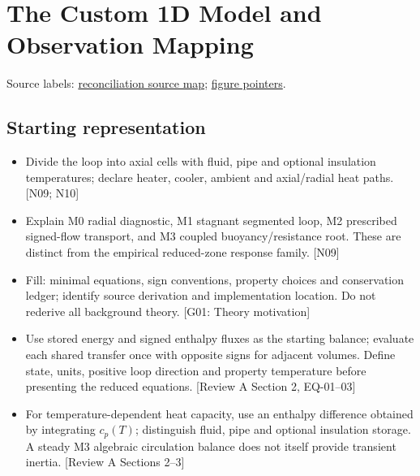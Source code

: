 \section{The Custom 1D Model and Observation Mapping}
\noindent\small Source labels: \href{run:doc_support/reconciliation/2026-11-02/SOURCES.md}{reconciliation source map}; \href{run:doc_support/reconciliation/2026-11-02/FIGURE_POINTERS.md}{figure pointers}.\normalsize

\subsection{Starting representation}
\begin{itemize}[leftmargin=*]
\item Divide the loop into axial cells with fluid, pipe and optional insulation temperatures; declare heater, cooler, ambient and axial/radial heat paths. [N09; N10]
\item Explain M0 radial diagnostic, M1 stagnant segmented loop, M2 prescribed signed-flow transport, and M3 coupled buoyancy/resistance root. These are distinct from the empirical reduced-zone response family. [N09]
\item Fill: minimal equations, sign conventions, property choices and conservation ledger; identify source derivation and implementation location. Do not rederive all background theory. [G01: Theory motivation]
\item Use stored energy and signed enthalpy fluxes as the starting balance; evaluate each shared transfer once with opposite signs for adjacent volumes. Define state, units, positive loop direction and property temperature before presenting the reduced equations. [Review A Section 2, EQ-01--03]
\item For temperature-dependent heat capacity, use an enthalpy difference obtained by integrating $c_p(T)$; distinguish fluid, pipe and optional insulation storage. A steady M3 algebraic circulation balance does not itself provide transient inertia. [Review A Sections 2--3]
\end{itemize}

